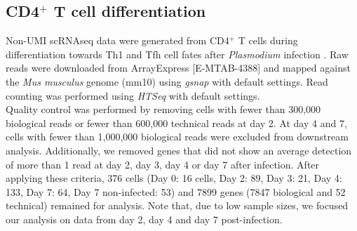 \subsection{CD4$^+$ T cell differentiation} \label{seq::data_cd4diff}
Non-UMI scRNAseq data were generated from CD4$^+$ T cells during differentiation towards Th1 and Tfh cell fates after \emph{Plasmodium} infection \citep{Lonnberg2017}. Raw reads were downloaded from ArrayExpress [E-MTAB-4388] and mapped against the \emph{Mus musculus} genome (mm10) using \emph{gsnap} \citep{Wu2010a} with default settings. Read counting was performed using \emph{HTSeq} \citep{Anders2014} with default settings. \\

Quality control was performed by removing cells with fewer than 300,000 biological reads or fewer than 600,000 technical reads at day 2. At day 4 and 7, cells with fewer than 1,000,000 biological reads were excluded from downstream analysis. Additionally, we removed genes that did not show an average detection of more than 1 read at day 2, day 3, day 4 or day 7 after infection. After applying these criteria, 376 cells (Day 0: 16 cells, Day 2: 89, Day 3: 21, Day 4: 133, Day 7: 64, Day 7 non-infected: 53) and 7899 genes (7847 biological and 52 technical) remained for analysis. Note that, due to low sample sizes, we focused our analysis on data from day 2, day 4 and day 7 post-infection.

\newpage

